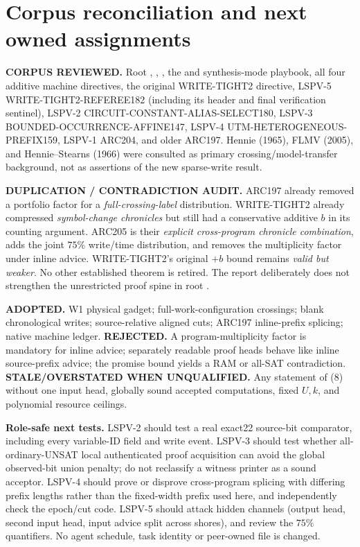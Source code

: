 \documentclass[11pt]{article}
\begin{document}
\section{Corpus reconciliation and next owned assignments}
\noindent\textbf{CORPUS REVIEWED.} Root ,
, , the
 and synthesis-mode
playbook, all four additive machine directives, the original
WRITE-TIGHT2 directive, LSPV-5 WRITE-TIGHT2-REFEREE182
(including its header and final verification sentinel),
LSPV-2 CIRCUIT-CONSTANT-ALIAS-SELECT180,
LSPV-3 BOUNDED-OCCURRENCE-AFFINE147,
LSPV-4 UTM-HETEROGENEOUS-PREFIX159,
LSPV-1 ARC204, and older ARC197.
Hennie (1965), FLMV (2005), and Hennie--Stearns (1966) were
consulted as primary crossing/model-transfer background,
not as assertions of the new sparse-write result.

\noindent\textbf{DUPLICATION / CONTRADICTION AUDIT.}
ARC197 already removed a portfolio factor for a
\emph{full-crossing-label} distribution.  WRITE-TIGHT2 already
compressed \emph{symbol-change chronicles} but still had a
conservative additive $b$ in its counting argument.
ARC205 is their \emph{explicit cross-program chronicle
combination}, adds the joint $75\%$ write/time distribution,
and removes the multiplicity factor under inline advice.
WRITE-TIGHT2's original $+b$ bound remains \emph{valid but weaker}.
No other established theorem is retired.
The report deliberately does not strengthen the unrestricted
proof spine in root .

\noindent\textbf{ADOPTED.} W1 physical gadget; full-work-configuration
crossings; blank chronological writes; source-relative aligned
cuts; ARC197 inline-prefix splicing; native machine ledger.
\textbf{REJECTED.} A program-multiplicity factor is mandatory
for inline advice; separately readable proof heads behave like
inline source-prefix advice; the promise bound yields a RAM
or all-SAT contradiction. \textbf{STALE/OVERSTATED WHEN
UNQUALIFIED.} Any statement of (8) without one input head,
globally sound accepted computations, fixed $U,k$,
and polynomial resource ceilings.

\noindent\textbf{Role-safe next tests.}
LSPV-2 should test a real exact22 source-bit comparator,
including every variable-ID field and write event.
LSPV-3 should test whether all-ordinary-UNSAT local
authenticated proof acquisition can avoid the global
observed-bit union penalty; do not reclassify a witness printer
as a sound acceptor. LSPV-4 should prove or disprove
cross-program splicing with differing prefix lengths rather
than the fixed-width prefix used here, and independently
check the epoch/cut code. LSPV-5 should attack hidden
channels (output head, second input head, input advice
split across shores), and review the $75\%$ quantifiers.
No agent schedule, task identity or peer-owned file is changed.
\end{document}
